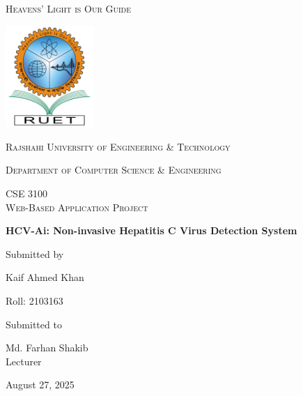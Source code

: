 \documentclass[12pt,a4paper]{article}
\newcommand{\univ}{Rajshahi University of Engineering \& Technology}
\newcommand{\thedept}{Department of Computer Science \& Engineering}
\newcommand{\thecourse}{CSE 3100 \\ Web-Based Application Project}
\newcommand{\labgraph}{HCV-Ai: Non-invasive Hepatitis C Virus Detection System}
\newcommand{\thetitle}{\labgraph}
\newcommand{\theauthor}{Kaif Ahmed Khan}
\newcommand{\thesupervisor}{Md. Farhan Shakib}
\newcommand{\lec}{Lecturer}
\newcommand{\thedesignation}{\lec}
\begin{document}
\begin{titlepage}
\centering
{\scshape Heavens' Light is Our Guide\par}\vspace{.25cm}
\includegraphics[width=0.25\textwidth]{logo}\par\vspace{1cm}
{\scshape\LARGE \univ\par}
\vspace{.5cm}
{\scshape\Large \thedept\par}
\vspace{1cm}
{\scshape\Large \thecourse\par}
\vspace{1cm}
{\huge\bfseries \thetitle\par}
\vspace{1cm}
Submitted by\par
{\Large \theauthor\par}
{\Large Roll: 2103163\par}
\vfill
Submitted to\par
{\Large \thesupervisor\\\thedesignation\par}
\vfill
{\large August 27, 2025\par}
\end{titlepage}
\tableofcontents
\listoflistings
\listoffigures
\newpage






\end{document}
